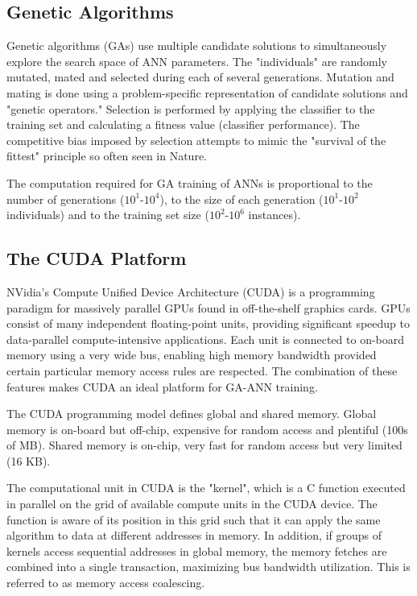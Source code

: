 \documentclass[11pt]{article}       %
\begin{document}
\subsection{Genetic Algorithms} \label{ga}
Genetic algorithms (GAs) use multiple candidate solutions to simultaneously explore the search space of ANN parameters. The "individuals" are randomly mutated, mated and selected during each of several generations. Mutation and mating is done using a problem-specific representation of candidate solutions and "genetic operators." Selection is performed by applying the classifier to the training set and calculating a fitness value (classifier performance). The competitive bias imposed by selection attempts to mimic the "survival of the fittest" principle so often seen in Nature.

The computation required for GA training of ANNs is proportional to the number of generations ($10^1$-$10^4$), to the size of each generation ($10^1$-$10^2$ individuals) and to the training set size ($10^2$-$10^6$ instances).

\subsection{The CUDA Platform} \label{cuda}
NVidia's Compute Unified Device Architecture (CUDA) is a programming paradigm for massively parallel GPUs found in off-the-shelf graphics cards. GPUs consist of many independent floating-point units, providing significant speedup to data-parallel compute-intensive applications. Each unit is connected to on-board memory using a very wide bus, enabling high memory bandwidth provided certain particular memory access rules are respected. The combination of these features makes CUDA an ideal platform for GA-ANN training.

The CUDA programming model defines global and shared memory. Global memory is on-board but off-chip, expensive for random access and plentiful (100s of MB). Shared memory is on-chip, very fast for random access but very limited (16 KB).

The computational unit in CUDA is the "kernel", which is a C function executed in parallel on the grid of available compute units in the CUDA device. The function is aware of its position in this grid such that it can apply the same algorithm to data at different addresses in memory. In addition, if groups of kernels access sequential addresses in global memory, the memory fetches are combined into a single transaction, maximizing bus bandwidth utilization. This is referred to as memory access coalescing.
\end{document}
